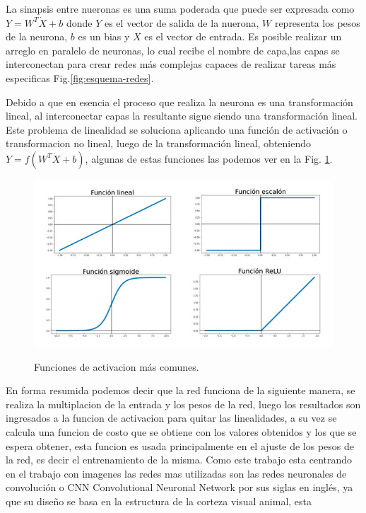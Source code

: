 La sinapsis entre nueronas es una suma poderada que puede ser expresada como $Y =W^T\dot X + b$ donde $Y$ es el vector de salida de la nuerona,
$W$ representa los pesos de la neurona, $b$ es un bias y $X$ es el vector de entrada.
Es posible realizar un arreglo en paralelo de neuronas, lo cual recibe el nombre de capa,las capas se interconectan para crear redes
más complejas capaces de realizar tareas más especificas Fig.\ref*{fig:esquema-redes}.

Debido a que en esencia el proceso que realiza la neurona es una transformación lineal, al interconectar capas la resultante sigue siendo
una transformación lineal. Este problema de linealidad se soluciona aplicando una función de activación o transformacion no lineal,
luego de la transformación lineal, obteniendo $Y= f(W^T \dot X + b)$, algunas de estas funciones las podemos ver en la
Fig. \ref*{fig:funciones-activacion}.
\begin{figure}
    \centering
    \includegraphics[width=1\textwidth]{imgs/Funciones-de-activacion.jpg}
    \label{fig:funciones-activacion}
    \caption{Funciones de activacion más comunes.}
\end{figure}
En forma resumida podemos decir que la red funciona de la siguiente manera, se realiza la multiplacion de la entrada y los pesos de la red,
luego los resultados son ingresados a la funcion de activacion para quitar las linealidades, a su vez se calcula una funcion de costo que se obtiene
con los valores obtenidos y los que se espera obtener, esta funcion es usada principalmente en el ajuste de los pesos de la red, es decir el
entrenamiento de la misma.
Como este trabajo esta centrando en el trabajo con imagenes las redes mas utilizadas son las redes neuronales de convolución o
CNN Convolutional Neuronal Network por sus siglas en inglés, ya que su diseño se basa en la estructura de la corteza visual animal, esta
